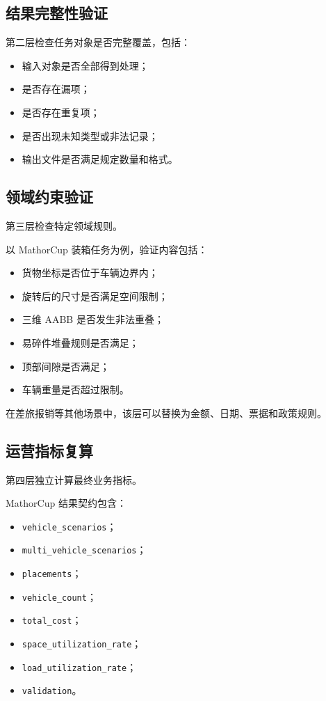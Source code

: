 \documentclass[UTF8,a4paper,12pt,oneside]{ctexbook}
\begin{document}
\subsection{结果完整性验证}

第二层检查任务对象是否完整覆盖，包括：

\begin{itemize}
    \item 输入对象是否全部得到处理；
    \item 是否存在漏项；
    \item 是否存在重复项；
    \item 是否出现未知类型或非法记录；
    \item 输出文件是否满足规定数量和格式。
\end{itemize}


\subsection{领域约束验证}

第三层检查特定领域规则。

以 MathorCup 装箱任务为例，验证内容包括：

\begin{itemize}
    \item 货物坐标是否位于车辆边界内；
    \item 旋转后的尺寸是否满足空间限制；
    \item 三维 AABB 是否发生非法重叠；
    \item 易碎件堆叠规则是否满足；
    \item 顶部间隙是否满足；
    \item 车辆重量是否超过限制。
\end{itemize}

在差旅报销等其他场景中，该层可以替换为金额、日期、票据和政策规则。


\subsection{运营指标复算}

第四层独立计算最终业务指标。

MathorCup 结果契约包含：

\begin{itemize}
    \item \texttt{vehicle\_scenarios}；
    \item \texttt{multi\_vehicle\_scenarios}；
    \item \texttt{placements}；
    \item \texttt{vehicle\_count}；
    \item \texttt{total\_cost}；
    \item \texttt{space\_utilization\_rate}；
    \item \texttt{load\_utilization\_rate}；
    \item \texttt{validation}。
\end{itemize}
\end{document}
